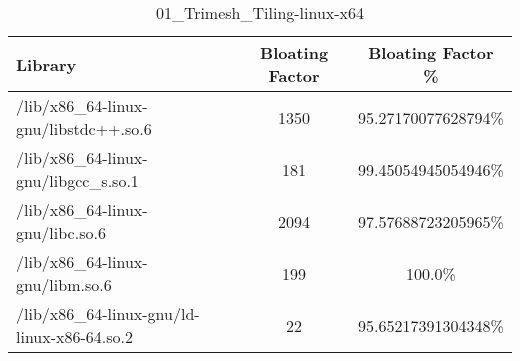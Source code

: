 \begin{table}[h]

\centering
\caption{01\_Trimesh\_Tiling-linux-x64}
\footnotesize
\begin{tabular}{l|c|c}
\toprule
Library & Bloating Factor & Bloating Factor \% \\ \midrule
\colorbox{gray!20}{/lib/x86\_64-linux-gnu/libstdc++.so.6} & 1350 & 95.27170077628794\% \\ \hline
\colorbox{gray!20}{/lib/x86\_64-linux-gnu/libgcc\_s.so.1} & 181 & 99.45054945054946\% \\ \hline
\colorbox{gray!20}{/lib/x86\_64-linux-gnu/libc.so.6} & 2094 & 97.57688723205965\% \\ \hline
/lib/x86\_64-linux-gnu/libm.so.6 & 199 & 100.0\% \\ \hline
/lib/x86\_64-linux-gnu/ld-linux-x86-64.so.2 & 22 & 95.65217391304348\% \\ \hline
\bottomrule
\end{tabular}
\end{table}

